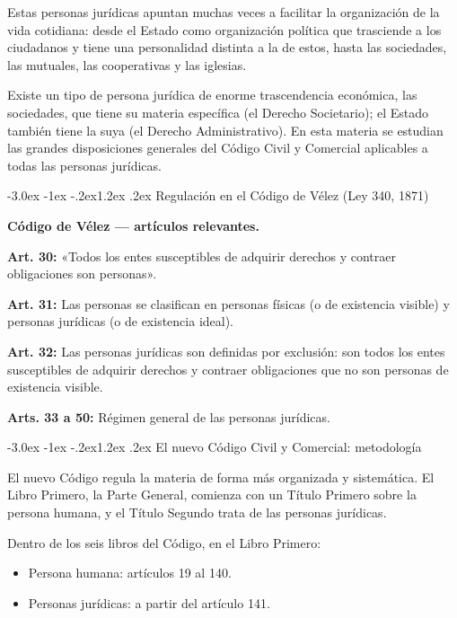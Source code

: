 \documentclass[12pt,oneside]{book}
\makeatletter
\renewcommand\section{\@startsection{section}{1}{\z@}%
  {-3.0ex \@plus -1ex \@minus -.2ex}{1.2ex \@plus .2ex}%
  {\normalfont\large\bfseries\color{acento}}}
\makeatother
\begin{document}
Estas personas jurídicas apuntan muchas veces a facilitar la organización de la vida cotidiana: desde el Estado como organización política que trasciende a los ciudadanos y tiene una personalidad distinta a la de estos, hasta las sociedades, las mutuales, las cooperativas y las iglesias.

\begin{nota}
Existe un tipo de persona jurídica de enorme trascendencia económica, las sociedades, que tiene su materia específica (el Derecho Societario); el Estado también tiene la suya (el Derecho Administrativo). En esta materia se estudian las grandes disposiciones generales del Código Civil y Comercial aplicables a todas las personas jurídicas.
\end{nota}

\section{Regulación en el Código de Vélez (Ley 340, 1871)}

\begin{nota}
\textbf{Código de Vélez --- artículos relevantes.}

\textbf{Art. 30:} «Todos los entes susceptibles de adquirir derechos y contraer obligaciones son personas».

\textbf{Art. 31:} Las personas se clasifican en personas físicas (o de existencia visible) y personas jurídicas (o de existencia ideal).

\textbf{Art. 32:} Las personas jurídicas son definidas por exclusión: son todos los entes susceptibles de adquirir derechos y contraer obligaciones que no son personas de existencia visible.

\textbf{Arts. 33 a 50:} Régimen general de las personas jurídicas.
\end{nota}

\section{El nuevo Código Civil y Comercial: metodología}

El nuevo Código regula la materia de forma más organizada y sistemática. El Libro Primero, la Parte General, comienza con un Título Primero sobre la persona humana, y el Título Segundo trata de las personas jurídicas.

Dentro de los seis libros del Código, en el Libro Primero:
\begin{itemize}
    \item Persona humana: artículos 19 al 140.
    \item Personas jurídicas: a partir del artículo 141.
\end{itemize}
\end{document}
